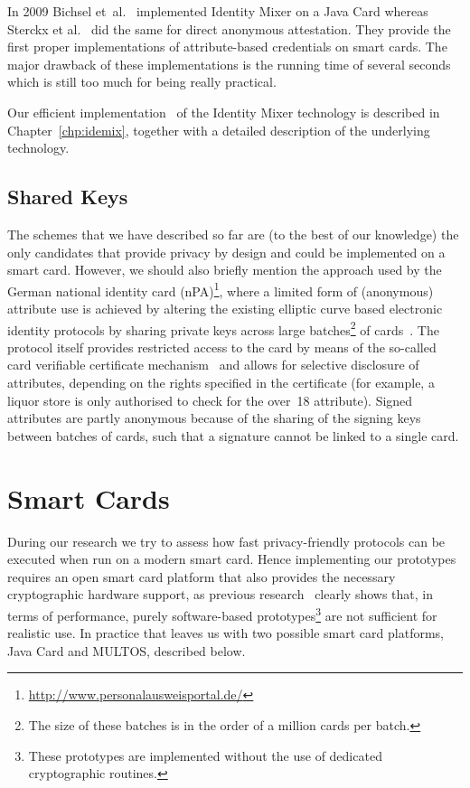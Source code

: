 In 2009 Bichsel et~al.~\cite{BichselCGS2009} implemented Identity Mixer
 on a Java Card whereas Sterckx et
al.~\cite{Sterckx09} did the same for direct anonymous attestation. They provide the first proper implementations of
attribute-based credentials on smart cards. The major drawback of these
implementations is the running time of several seconds which is still too much
for being really practical.

Our efficient implementation~\cite{VullersAlpar2013} of the Identity Mixer
 technology is described in Chapter~\ref{chp:idemix},
together with a detailed description of the underlying technology.

\subsection{Shared Keys\label{sec:nPA}}

The schemes that we have described so far are (to the best of our knowledge) the
only candidates that provide privacy by design and could be implemented on a
smart card. However, we should also briefly mention the approach used by
the German national identity card (nPA)\footnote{%
\url{http://www.personalausweisportal.de/}}, where a limited form of (anonymous)
 attribute use is achieved by altering the existing
elliptic curve based electronic identity protocols by sharing private keys
 across large batches\footnote{The size of these batches is in the order of a million cards per batch.} of cards~\cite{Kugler2010}. The
protocol itself provides restricted access to the card by means of the so-called
card verifiable certificate mechanism~\cite{EAC20} and allows for selective
disclosure of attributes, depending on the rights specified in the certificate
(for example, a liquor store is only authorised to check
for the \textsf{over~18} attribute). Signed attributes are partly anonymous
 because of the sharing of the signing keys between
batches of cards, such that a signature cannot be linked to a single card.

\section{Smart Cards\label{sec:smartcards}}

During our research we try to assess how fast privacy-friendly protocols can be
executed when run on a modern smart card. Hence
implementing our prototypes requires an open smart card platform that also provides the necessary cryptographic hardware support,
as previous research~\cite{TewsJacobs09} clearly shows that, in terms of
performance, purely software-based prototypes\footnote{These prototypes are 
implemented without the use of dedicated cryptographic routines.} are not 
sufficient for realistic use. In practice that leaves us with two possible 
smart card platforms, Java Card and MULTOS, 
described below.

